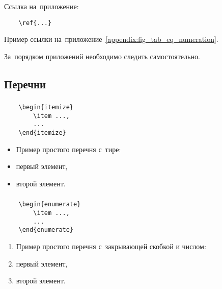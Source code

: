 \documentclass{mirea-prog-lang}
\begin{document}
Ссылка на~приложение:
\begin{verbatim}
	\ref{...}
\end{verbatim}

Пример ссылки на~приложение~\ref{appendix:fig_tab_eq_numeration}.

За~порядком приложений необходимо следить самостоятельно.

\subsection{Перечни}

\subsubsection{}

\begin{verbatim}
	\begin{itemize}
		\item ...,
		...
	\end{itemize}
\end{verbatim}

\begin{itemize}
	\item[] Пример простого перечня с~тире:
	\item первый элемент,
	\item второй элемент.
\end{itemize}

\subsubsection{}

\begin{verbatim}
	\begin{enumerate}
		\item ...,
		...
	\end{enumerate} 
\end{verbatim}

\begin{enumerate}
	\item[] Пример простого перечня с~закрывающей скобкой и числом:
	\item первый элемент,
	\item второй элемент.
\end{enumerate}
\end{document}
